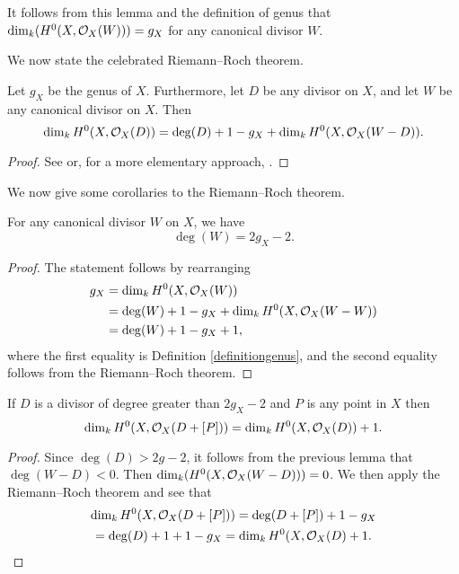 It follows from this lemma and the definition of genus that $\dim_k(H^0(X,{\cal O}_X(W))) = g_X$ for any canonical divisor $W$.

We now state the celebrated Riemann--Roch theorem.

    \begin{thm}\label{theoremriemannroch}
    Let $g_X$ be the genus of $X$.
    Furthermore, let $D$ be any divisor on $X$, and let $W$ be any canonical divisor on $X$.
    Then
        \[
        \dim_k H^0(X,{\cal O}_X(D)) = \deg(D) + 1 - g_X + \dim_k H^0(X,{\cal O}_X(W-D)).
        \]
    \end{thm}
    \begin{proof}
    See \cite[Chap.\ IV, \S 1, Thm.\ 1.3]{hart} or, for a more elementary approach, \cite[Chap.\ 8, \S 6]{fulton}.
    \end{proof}

We now give some corollaries to the Riemann--Roch theorem.

    \begin{cor}\label{cordegreeofcanonicaldivisor}
    For any canonical divisor $W$ on $X$, we have 
        \[
        \deg(W) = 2g_X-2.
        \]
    \end{cor}
    \begin{proof}
    The statement follows by rearranging
        \begin{align*}
        g_X & = \dim_k H^0(X,{\cal O}_X(W))  \\ & = \deg(W) + 1 -g_X +  \dim_k H^0(X,{\cal O}_X(W-W))\\ & = \deg(W) + 1 -g_X + 1,
        \end{align*}
    where the first equality is Definition \ref{definitiongenus}, and the second equality follows from the Riemann--Roch theorem.
    \end{proof}

    \begin{cor}
    If $D$ is a divisor of degree greater than $2g_X-2$ and $P$ is any point in $X$ then
        \[
        \dim_k H^0(X,{\cal O}_X(D +[P])) = \dim_k H^0(X,{\cal O}_X(D)) + 1.
        \]
    \end{cor}
    \begin{proof}
    Since $\deg(D) > 2g-2$, it follows from the previous lemma that $\deg(W-D) <0$.
    Then $\dim_k(H^0(X,{\cal O}_X(W - D)))  = 0$.
    We then apply the Riemann--Roch theorem and see that
        \begin{multline*}
        \dim_k H^0(X,{\cal O}_X(D + [P])) = \deg(D +[P]) + 1 - g_X \\ = \deg(D) + 1 + 1 - g_X = \dim_k H^0(X,{\cal O}_X(D) + 1.
        \end{multline*}
    \end{proof}

